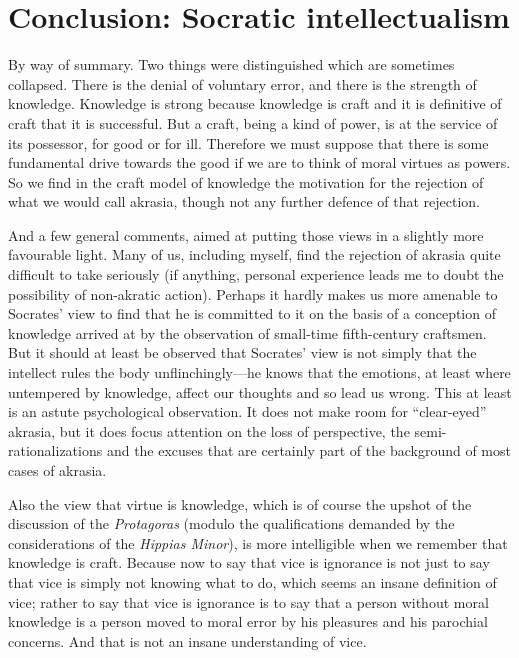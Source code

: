 \documentclass[11pt]{amsart}
\begin{document}

\section{Conclusion: Socratic intellectualism}


By way of summary. Two things were distinguished which are sometimes collapsed. There is the denial of voluntary error, and there is the strength of knowledge. Knowledge is strong because knowledge is craft and it is definitive of craft that it is successful. But a craft, being a kind of power, is at the service of its possessor, for good or for ill. Therefore we must suppose that there is some fundamental drive towards the good if we are to think of moral virtues as powers. So we find in the craft model of knowledge the motivation for the rejection of what we would call akrasia, though not any further defence of that rejection.

And a few general comments, aimed at putting those views in a slightly more favourable light. Many of us, including myself, find the rejection of akrasia quite difficult to take seriously (if anything, personal experience leads me to doubt the possibility of non-akratic action). Perhaps it hardly makes us more amenable to Socrates' view to find that he is committed to it on the basis of a conception of knowledge arrived at by the observation of small-time fifth-century craftsmen. But it should at least be observed that Socrates' view is not simply that the intellect rules the body unflinchingly---he knows that the emotions, at least where untempered by knowledge, affect our thoughts and so lead us wrong. This at least is an astute psychological observation. It does not make room for ``clear-eyed'' akrasia, but it does focus attention on the loss of perspective, the semi-rationalizations and the excuses that are certainly part of the background of most cases of akrasia.

Also the view that virtue is knowledge, which is of course the upshot of the discussion of the \emph{Protagoras} (modulo the qualifications demanded by the considerations of the \emph{Hippias Minor}), is more intelligible when we remember that knowledge is craft. Because now to say that vice is ignorance is not just to say that vice is simply not knowing what to do, which seems an insane definition of vice; rather to say that vice is ignorance is to say that a person without moral knowledge is a person moved to moral error by his pleasures and his parochial concerns. And that is not an insane understanding of vice.
\end{document}
